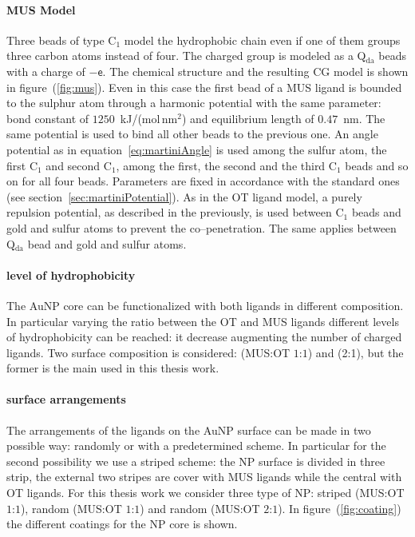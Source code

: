 \paragraph{\textbf{MUS Model}} Three \martini beads of type C$_1$ model the hydrophobic chain even if one of them groups three carbon atoms instead of four. The charged group is modeled as a Q$_\text{da}$ beads with a charge of $-\mathsf{e}$. The chemical structure and the resulting \ac{CG} \martini model is shown in figure~(\ref{fig:mus}). Even in this case the first bead of a \ac{MUS} ligand is bounded to the sulphur atom through a harmonic potential with the same parameter: bond constant of $1250$~kJ/(mol\,nm$^2$) and equilibrium length of $0.47$~nm. The same potential is used to bind all other beads to the previous one. An angle potential as in equation~\eqref{eq:martiniAngle} is used among the sulfur atom, the first C$_1$ and second C$_1$, among the first, the second and the third C$_1$ beads and so on for all four beads. Parameters are fixed in accordance with the standard \martini ones (see section~\ref{sec:martiniPotential}). As in the \ac{OT} ligand model, a purely repulsion potential, as described in the previously, is used between C$_1$ beads and gold and sulfur atoms to prevent the co--penetration. The same applies between Q$_\text{da}$ bead and gold and sulfur atoms.

\paragraph{\textbf{level of hydrophobicity}} The \ac{AuNP} core can be functionalized with both ligands in different composition. In particular varying the ratio between the \ac{OT} and \ac{MUS} ligands different levels of hydrophobicity can be reached: it decrease augmenting the number of charged ligands. Two surface composition is considered: (\ac{MUS}:\ac{OT} $1$:$1$) and (2:1), but the former is the main used in this thesis work.

\paragraph{\textbf{surface arrangements}} The arrangements of the ligands on the \ac{AuNP} surface can be made in two possible way: randomly or with a predetermined scheme. In particular for the second possibility we use a striped scheme: the \ac{NP} surface is divided in three strip, the external two stripes are cover with \ac{MUS} ligands while the central with \ac{OT} ligands. For this thesis work we consider three type of \ac{NP}: striped (\ac{MUS}:\ac{OT} $1$:$1$), random (\ac{MUS}:\ac{OT} $1$:$1$) and random (\ac{MUS}:\ac{OT} $2$:$1$). In figure~(\ref{fig:coating}) the different coatings for the \ac{NP} core is shown.

